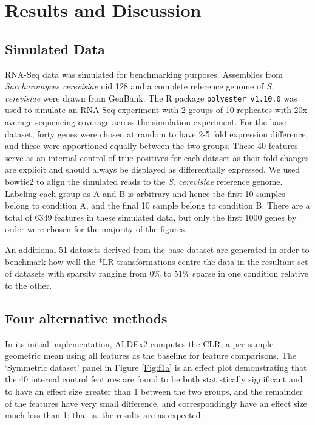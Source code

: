\documentclass{bmcart}
\begin{document}
\section*{Results and Discussion}

\subsection*{Simulated Data}


RNA-Seq data was simulated for benchmarking purposes. Assemblies from \textit{Saccharomyces cerevisiae} uid 128 and  a complete reference genome of \textit{S. cerevisiae} were drawn from GenBank. The R package \texttt{polyester v1.10.0} \cite{polyester:2016} was used to simulate an RNA-Seq experiment with 2 groups of 10 replicates with 20x average sequencing coverage across the simulation experiment. For the base dataset, forty genes were chosen at random to have 2-5 fold expression difference, and these were apportioned equally between the two groups. These 40 features serve as an internal control of true positives for each dataset as their fold changes are explicit and should always be displayed as differentially expressed. We used bowtie2 \cite{bowtie2} to align the simulated reads  to the \textit{S. cerevisiae} reference genome. Labeling each group as A and B is arbitrary and hence the first 10 samples belong to condition A, and the final 10 sample belong to condition B. There are a total of 6349 features in these simulated data, but only the first 1000 genes by order were chosen for the majority of the figures. 

An additional 51 datasets derived from the base dataset are generated in order to benchmark how well the *LR transformations centre the data in the resultant set of datasets with sparsity ranging from 0\% to 51\% sparse in one condition relative to the other. 


\subsection*{Four alternative methods}


In its initial implementation, ALDEx2 computes the CLR, a per-sample geometric mean using all features as the baseline for feature comparisons. The `Symmetric dataset' panel in Figure \ref{Fig:f1a} is an effect plot demonstrating that the 40 internal control features are found to be both statistically significant and to have an effect size greater than 1 between the two groups, and the remainder of the features have very small difference, and correspondingly have an effect size much less than 1; that is, the results are as expected. 
\end{document}

